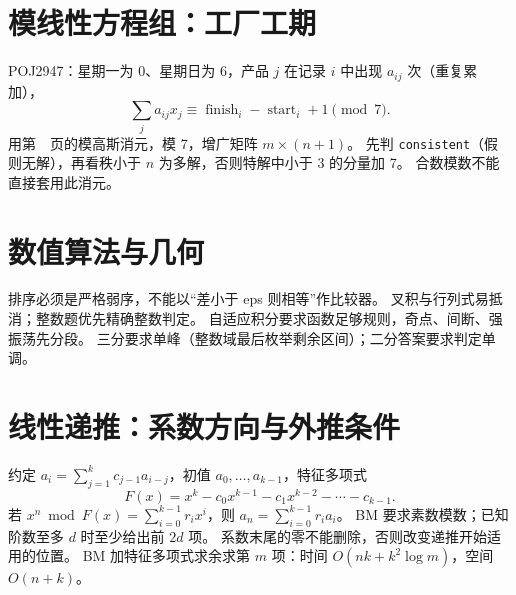 \section{模线性方程组：工厂工期}\label{knowledge-widget-gauss}
POJ2947：星期一为 0、星期日为 6，产品 $j$ 在记录 $i$ 中出现 $a_{ij}$ 次（重复累加），
\[
\sum_j a_{ij}x_j\equiv \operatorname{finish}_i-\operatorname{start}_i+1\pmod7.
\]
用第~\pageref{compact-GaussMod}~页的模高斯消元，模 7，增广矩阵 $m\times(n+1)$。
先判 \texttt{consistent}（假则无解），再看秩小于 $n$ 为多解，否则特解中小于 3 的分量加 7。
合数模数不能直接套用此消元。

\section{数值算法与几何}\label{knowledge-numerical-boundaries}
排序必须是严格弱序，不能以“差小于 eps 则相等”作比较器。
叉积与行列式易抵消；整数题优先精确整数判定。
自适应积分要求函数足够规则，奇点、间断、强振荡先分段。
三分要求单峰（整数域最后枚举剩余区间）；二分答案要求判定单调。

\section{线性递推：系数方向与外推条件}\label{knowledge-recurrence-direction}
约定 $a_i=\sum_{j=1}^{k}c_{j-1}a_{i-j}$，初值 $a_0,\ldots,a_{k-1}$，特征多项式
\[
F(x)=x^k-c_0x^{k-1}-c_1x^{k-2}-\cdots-c_{k-1}.
\]
若 $x^n\bmod F(x)=\sum_{i=0}^{k-1}r_ix^i$，则 $a_n=\sum_{i=0}^{k-1}r_ia_i$。
BM 要求素数模数；已知阶数至多 $d$ 时至少给出前 $2d$ 项。
系数末尾的零不能删除，否则改变递推开始适用的位置。
BM 加特征多项式求余求第 $m$ 项：时间 $O(nk+k^2\log m)$，空间 $O(n+k)$。

